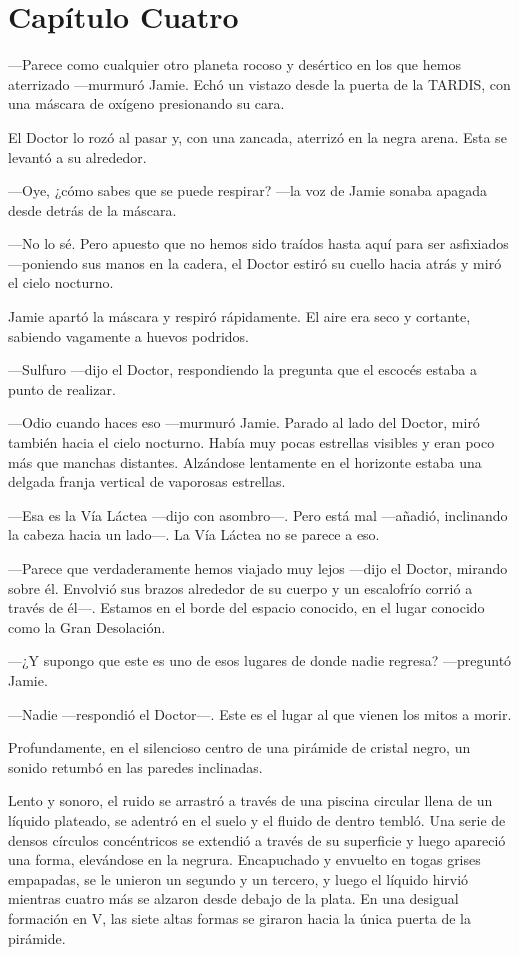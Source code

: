 \chapter*{Capítulo Cuatro}

---Parece como cualquier otro planeta rocoso y desértico en los que
hemos aterrizado ---murmuró Jamie. Echó un vistazo desde la puerta de la
TARDIS, con una máscara de oxígeno presionando su cara.

El Doctor lo rozó al pasar y, con una zancada, aterrizó en la negra
arena. Esta se levantó a su alrededor.

---Oye, ¿cómo sabes que se puede respirar? ---la voz de Jamie sonaba
apagada desde detrás de la máscara.

---No lo sé. Pero apuesto que no hemos sido traídos hasta aquí para ser
asfixiados ---poniendo sus manos en la cadera, el Doctor estiró su
cuello hacia atrás y miró el cielo nocturno.

Jamie apartó la máscara y respiró rápidamente. El aire era seco y
cortante, sabiendo vagamente a huevos podridos.

---Sulfuro ---dijo el Doctor, respondiendo la pregunta que el escocés
estaba a punto de realizar.

---Odio cuando haces eso ---murmuró Jamie. Parado al lado del Doctor,
miró también hacia el cielo nocturno. Había muy pocas estrellas visibles
y eran poco más que manchas distantes. Alzándose lentamente en el
horizonte estaba una delgada franja vertical de vaporosas estrellas.

---Esa es la Vía Láctea ---dijo con asombro---. Pero está mal ---añadió,
inclinando la cabeza hacia un lado---. La Vía Láctea no se parece a eso.

---Parece que verdaderamente hemos viajado muy lejos ---dijo el Doctor,
mirando sobre él. Envolvió sus brazos alrededor de su cuerpo y un
escalofrío corrió a través de él---. Estamos en el borde del espacio
conocido, en el lugar conocido como la Gran Desolación.

---¿Y supongo que este es uno de esos lugares de donde nadie
regresa? ---preguntó Jamie.

---Nadie ---respondió el Doctor---. Este es el lugar al que vienen los
mitos a morir.

Profundamente, en el silencioso centro de una pirámide de cristal negro,
un sonido retumbó en las paredes inclinadas.

Lento y sonoro, el ruido se arrastró a través de una piscina circular
llena de un líquido plateado, se adentró en el suelo y el fluido de
dentro tembló. Una serie de densos círculos concéntricos se extendió a
través de su superficie y luego apareció una forma, elevándose en la
negrura. Encapuchado y envuelto en togas grises empapadas, se le unieron
un segundo y un tercero, y luego el líquido hirvió mientras cuatro más
se alzaron desde debajo de la plata. En una desigual formación en V, las
siete altas formas se giraron hacia la única puerta de la pirámide.

